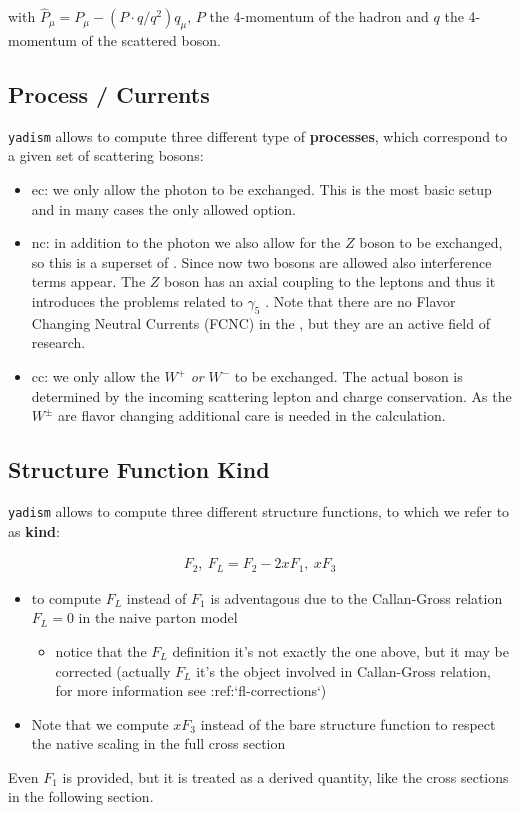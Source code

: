 with $\hat P_\mu = P_\mu - (P\cdot q / q^2) q_\mu$, $P$ the 4-momentum of the
hadron and $q$ the 4-momentum of the scattered boson.

\subsection{Process / Currents}

\texttt{yadism} allows to compute three different type of \textbf{processes}, which correspond to a
given set of scattering bosons:

\begin{itemize}
  \item \acrfull{ec}: we only allow the photon to be exchanged.
    This is the most basic setup and in many cases the only allowed option.
  \item \acrfull{nc}: in addition to the photon we also allow for the
    $Z$ boson to be exchanged, so this is a superset of \ec.
    Since now two bosons are allowed also interference terms appear.
    The $Z$ boson has an axial coupling to the leptons and thus it introduces the
    problems related to $\gamma_5$ \cite{Gnendiger:2017pys}.
    Note that there are no Flavor Changing Neutral Currents (FCNC) in the \sm,
    but they are an active field of research.
  \item \acrfull{cc}: we only allow the $W^+$ \textit{or} $W^-$ to be
    exchanged. The actual boson is determined by the incoming scattering lepton
    and charge conservation. As the $W^\pm$ are flavor changing additional care
    is needed in the calculation.
\end{itemize}


\subsection{Structure Function Kind}

\texttt{yadism} allows to compute three different structure functions, to which we refer to as \textbf{kind}:

\begin{align}
    F_2,~ F_L = F_2 - 2xF_1,~ xF_3
\end{align}

\begin{itemize}
\item to compute $F_L$ instead of $F_1$ is adventagous due to the Callan-Gross relation
  \cite{Callan:1969uq} $F_L=0$ in the naive parton model
  \begin{itemize}
  \item notice that the $F_L$ definition it's not exactly the one above, but
    it may be corrected (actually $F_L$ it's the object involved in
    Callan-Gross relation, for more information see :ref:`fl-corrections`)
  \end{itemize}
\item Note that we compute $xF_3$ instead of the bare structure function to respect the native
  scaling in the full cross section
\end{itemize}
Even $F_1$ is provided, but it is treated as a derived quantity, like the cross
sections in the following section.

